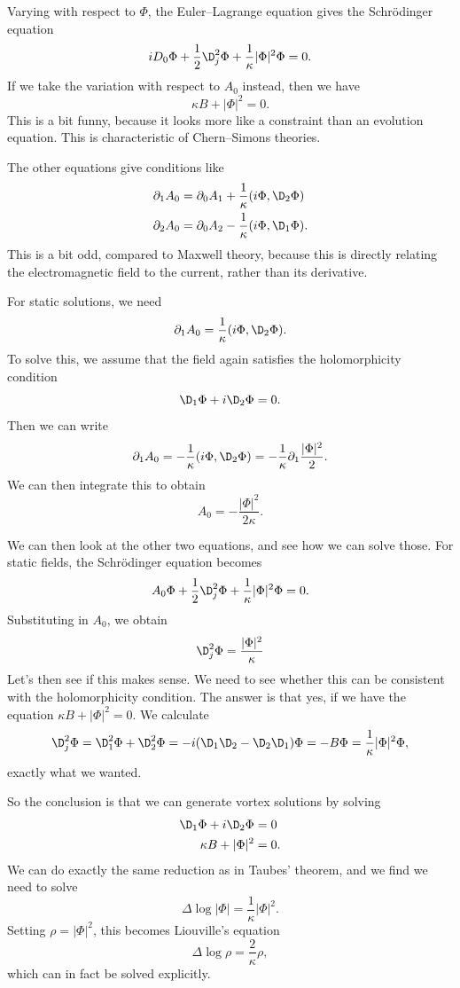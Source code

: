 \documentclass[a4paper]{article}
\begin{document}
Varying with respect to $\Phi$, the Euler--Lagrange equation gives the Schr\"odinger equation
\[
  i D_0 \Phi + \frac{1}{2} \D_j^2 \Phi + \frac{1}{\kappa} |\Phi|^2 \Phi = 0.
\]
If we take the variation with respect to $A_0$ instead, then we have
\[
  \kappa B + |\Phi|^2 = 0.
\]
This is a bit funny, because it looks more like a constraint than an evolution equation. This is characteristic of Chern--Simons theories.

The other equations give conditions like
\begin{align*}
  \partial_1 A_0 &= \partial_0 A_1 + \frac{1}{\kappa} (i \Phi, \D_2 \Phi)\\
  \partial_2 A_0 &= \partial_0 A_2 - \frac{1}{\kappa} (i \Phi, \D_1 \Phi).
\end{align*}
This is a bit odd, compared to Maxwell theory, because this is directly relating the electromagnetic field to the current, rather than its derivative.

For static solutions, we need
\[
  \partial_1 A_0 = \frac{1}{\kappa} (i \Phi, \D_2 \Phi).
\]
To solve this, we assume that the field again satisfies the holomorphicity condition
\[
  \D_1 \Phi + i \D_2 \Phi = 0.
\]
Then we can write
\[
  \partial_1 A_0 = -\frac{1}{\kappa} (i \Phi, \D_2 \Phi) = - \frac{1}{\kappa} \partial_1 \frac{|\Phi|^2}{2}.
\]
We can then integrate this to obtain
\[
  A_0 = -\frac{|\Phi|^2}{ 2 \kappa}.
\]

We can then look at the other two equations, and see how we can solve those. For static fields, the Schr\"odinger equation becomes
\[
  A_0 \Phi + \frac{1}{2} \D_j^2 \Phi + \frac{1}{\kappa} |\Phi|^2 \Phi = 0.
\]
Substituting in $A_0$, we obtain
\[
  \D_j^2 \Phi = \frac{|\Phi|^2}{\kappa}
\]
Let's then see if this makes sense. We need to see whether this can be consistent with the holomorphicity condition. The answer is that yes, if we have the equation $\kappa B + |\Phi|^2 = 0$. We calculate
\[
  \D_j^2 \Phi = \D_1^2 \Phi + \D_2^2 \Phi = -i (\D_1 \D_2 - \D_2 \D_1) \Phi = - B \Phi = \frac{1}{\kappa} |\Phi|^2 \Phi,
\]
exactly what we wanted.

So the conclusion is that we can generate vortex solutions by solving
\begin{align*}
  \D_1 \Phi + i \D_2 \Phi &= 0\\
  \kappa B + |\Phi|^2 &= 0.
\end{align*}
We can do exactly the same reduction as in Taubes' theorem, and we find we need to solve
\[
  \Delta \log |\Phi| = \frac{1}{\kappa} |\Phi|^2.
\]
Setting $\rho = |\Phi|^2$, this becomes Liouville's equation
\[
  \Delta \log \rho = \frac{2}{\kappa}\rho,
\]
which can in fact be solved explicitly.
\end{document}
